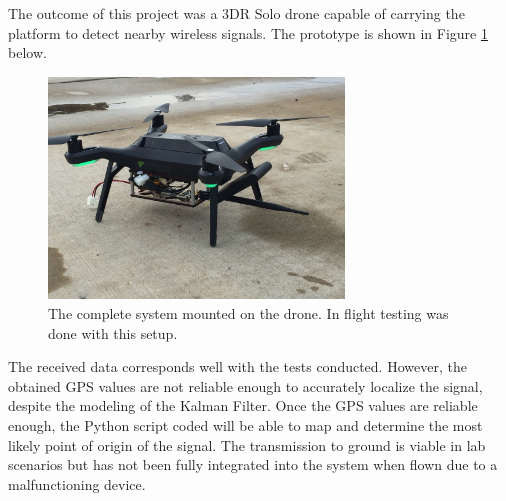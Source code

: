 The outcome of this project was a 3DR Solo drone capable of carrying the platform to detect nearby wireless signals. The prototype is shown in Figure \ref{fig:drone_and_box_exec} below.
\begin{figure}[ht!]
    \centering
    \includegraphics[width=0.70\textwidth]{img/drone_and_box.jpg}
    \caption{The complete system mounted on the drone. In flight testing was done with this setup.}
    \label{fig:drone_and_box_exec}
\end{figure}
The received data corresponds well with the tests conducted. However, the obtained GPS values are not reliable enough to accurately localize the signal, despite the modeling of the Kalman Filter. Once the GPS values are reliable enough, the Python script coded will be able to map and determine the most likely point of origin of the signal. The transmission to ground is viable in lab scenarios but has not been fully integrated into the system when flown due to a malfunctioning device. \par